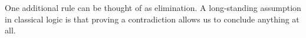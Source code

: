 One additional rule can be thought of as \ebot elimination. A long-standing
assumption in classical logic is that proving a contradiction allows us to
conclude anything at all.

\begin{fitchrule}[Explosion]
  \label{def:explosion-rule}
  \leavevmode
  \vspace{-0.9\baselineskip}
  \begin{fitchproof}
     {\ebot}
     {\ephi} 
  \end{fitchproof}
\end{fitchrule}
